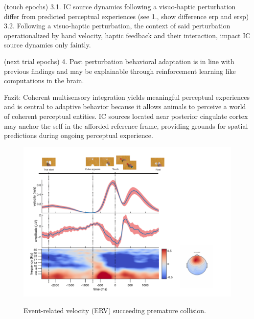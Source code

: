 (touch epochs)
3.1. IC source dynamics following a visuo-haptic perturbation differ from predicted perceptual experiences (see 1., show difference erp and ersp)
3.2. Following a visuo-haptic perturbation, the context of said perturbation operationalized by hand velocity, haptic feedback and their interaction, impact IC source dynamics only faintly.

(next trial epochs)
4. Post perturbation behavioral adaptation is in line with previous findings and may be explainable through reinforcement learning like computations in the brain.

Fazit:
Coherent multisensory integration yields meaningful perceptual experiences and is central to adaptive behavior because it allows animals to perceive a world of coherent perceptual entities. IC sources located near posterior cingulate cortex may anchor the self in the afforded reference frame, providing grounds for spatial predictions during ongoing perceptual experience.


\begin{figure}[h]
  \includegraphics[width=\textwidth]{figures/pe_results_description.pdf}
  \label{res_desc}
  \caption{Event-related velocity (ERV) succeeding premature collision.}
\end{figure}